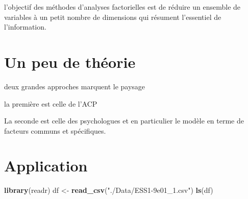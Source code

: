 \documentclass[
]{book}
\newenvironment{Shaded}{\begin{snugshade}}{\end{snugshade}}
\newcommand{\KeywordTok}[1]{\textcolor[rgb]{0.13,0.29,0.53}{\textbf{#1}}}
\newcommand{\NormalTok}[1]{#1}
\newcommand{\StringTok}[1]{\textcolor[rgb]{0.31,0.60,0.02}{#1}}
\begin{document}
l'objectif des méthodes d'analyses factorielles est de réduire un ensemble de variables à un petit nombre de dimensions qui résument l'essentiel de l'information.

\hypertarget{un-peu-de-thuxe9orie}{%
\section{Un peu de théorie}\label{un-peu-de-thuxe9orie}}

deux grandes approches marquent le paysage

la première est celle de l'ACP

La seconde est celle des psychologues et en particulier le modèle en terme de facteurs communs et spécifiques.

\hypertarget{application}{%
\section{Application}\label{application}}

\begin{Shaded}
\begin{Highlighting}[]
\KeywordTok{library}\NormalTok{(readr)}
\NormalTok{df <-}\StringTok{ }\KeywordTok{read_csv}\NormalTok{(}\StringTok{"./Data/ESS1-9e01_1.csv"}\NormalTok{)}
\KeywordTok{ls}\NormalTok{(df)}
\end{Highlighting}
\end{Shaded}
\end{document}
